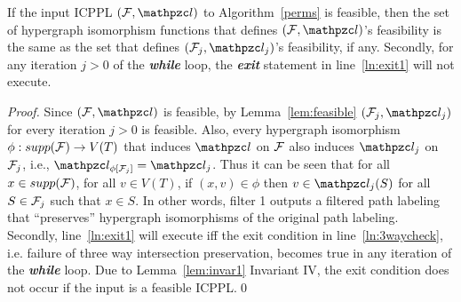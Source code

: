 \documentclass[MS]             %
              {iitmdiss_as}    %
\begin{document}
\begin{lemma}
  \label{lem:noexit1}
  If the input ICPPL $(\cF, \cl)$ to Algorithm~\ref{perms} is
  feasible, then the set of hypergraph isomorphism functions that
  defines $(\cF, \cl)$'s feasibility is the same as the set that
  defines $(\cF_j, \cl_j)$'s feasibility, if any.  Secondly, for any
  iteration $j > 0$ of the {\em \bf while} loop, the {\em \bf exit}
  statement in line~\ref{ln:exit1} will not execute.
\end{lemma}
\begin{proof}
  Since $(\cF,\cl)$ is feasible, by Lemma~\ref{lem:feasible}
  $(\cF_j,\cl_j)$ for every iteration $j > 0$ is feasible.  %
  Also, every hypergraph isomorphism $\phi: supp({\cal F}) \rightarrow
  V(T)$ that induces $\cl$ on ${\cal F}$ also induces $\cl_{j}$ on
  ${\cal F}_{j}$, i.e., $\cl_{\phi[\cF_j]} = \cl_j$. Thus it can be seen
  that for all $x \in supp({\cal F})$, for all $v \in V(T)$, if $(x,v) \in
  \phi$ then $v \in \cl_{j}(S)$ for all $S \in {\cal F}_{j}$ such that $x
  \in S$.
  In other words, filter 1 outputs a filtered path labeling that
  ``preserves''
  hypergraph isomorphisms of the original path labeling.\\
  Secondly, line~\ref{ln:exit1} will execute iff the exit condition in
  line~\ref{ln:3waycheck}, i.e. failure of three way intersection
  preservation, becomes true in any iteration of the {\em \bf while}
  loop.  Due to Lemma~\ref{lem:invar1} Invariant IV, the exit
  condition does not occur if the input is a feasible ICPPL.\qed



\end{proof}
\end{document}
